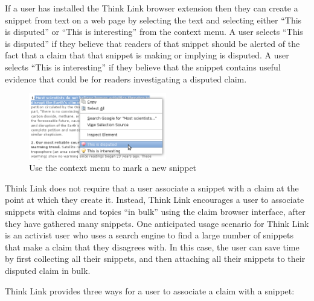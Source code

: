 \documentclass{chi2009}
\begin{document}
If a user has installed the Think Link browser extension then they can create a snippet from text on a web page by selecting the text and selecting either ``This is disputed'' or ``This is interesting'' from the context menu. A user selects ``This is disputed'' if they believe that readers of that snippet should be alerted of the fact that a claim that that snippet is making or implying is disputed. A user selects ``This is interesting'' if they believe that the snippet contains useful evidence that could be for readers investigating a disputed claim. 

\begin{figure}[tb]
	\begin{center}
	\includegraphics[width=6cm]{../screenshots/v2_snipmark.png}
	\caption{Use the context menu to mark a new snippet}
	\label{createprocess}
	\end{center}
\end{figure}

Think Link does not require that a user associate a snippet with a claim at the point at which they create it. Instead, Think Link encourages a user to associate snippets with claims and topics ``in bulk'' using the claim browser interface, after they have gathered many snippets. 
One anticipated usage scenario for Think Link is an activist user who uses a search engine to find a large number of snippets that make a claim that they disagrees with. 
In this case, the user can save time by first collecting all their snippets, and then attaching all their snippets to their disputed claim in bulk.

Think Link provides three ways for a user to associate a claim with a snippet:
\end{document}
